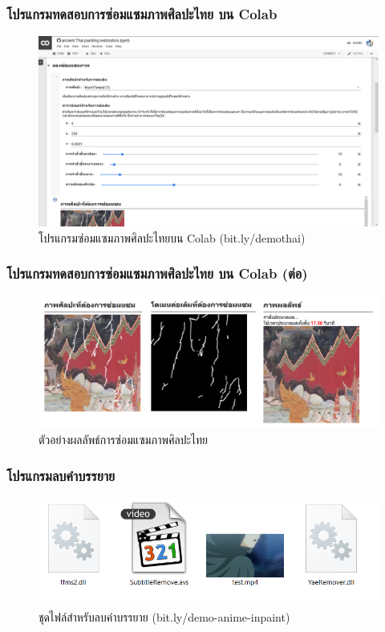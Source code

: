 \documentclass[xcolor=dvipsnames, xetex,serif]{beamer}
\numberwithin{equation}{section}
\begin{document}
		\begin{frame}
			\frametitle{โปรแกรมทดสอบการซ่อมแซมภาพศิลปะไทย บน Colab}
			\begin{figure}
				\includegraphics[width=0.8\linewidth]{images/colab/colab_preview.png}
				\caption{โปรแกรมซ่อมแซมภาพศิลปะไทยบน Colab (bit.ly/demothai)}
			\end{figure}
		\end{frame}
		\begin{frame}
			\frametitle{โปรแกรมทดสอบการซ่อมแซมภาพศิลปะไทย บน Colab (ต่อ)}
			\begin{figure}
				\includegraphics[width=0.8\linewidth]{images/colab/inpaint_display.png}
				\caption{ตัวอย่างผลลัพธ์การซ่อมแซมภาพศิลปะไทย}
			\end{figure}
		\end{frame}
		\begin{frame}
			\frametitle{โปรแกรมลบคำบรรยาย}
			\begin{figure}
				\includegraphics[width=0.8\linewidth]{images/demo_anime/file.png}
				\caption{ชุดไฟล์สำหรับลบคำบรรยาย (bit.ly/demo-anime-inpaint)}
			\end{figure}
		\end{frame}
\end{document}
